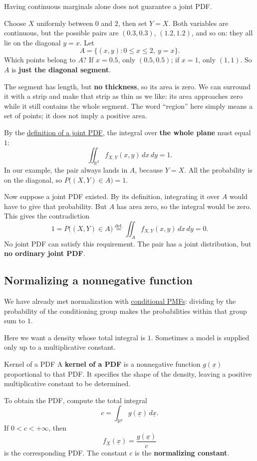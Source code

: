 \documentclass[a4paper,12pt,oneside]{report}
\begin{document}
\begin{notebox}
Having continuous marginals alone does not guarantee a joint PDF.

Choose $X$ uniformly between $0$ and $2$, then set $Y=X$.
Both variables are continuous, but the possible pairs are
$(0.3,0.3)$, $(1.2,1.2)$, and so on: they all lie on the
diagonal $y=x$. Let
\[
  A=\{(x,y):0\leq x\leq2,\ y=x\}.
\]
Which points belong to $A$? If $x=0.5$, only $(0.5,0.5)$;
if $x=1$, only $(1,1)$. So $A$ is \textbf{just the diagonal
segment}.

The segment has length, but \textbf{no thickness}, so its area
is zero. We can surround it with a strip and make that strip
as thin as we like: its area approaches zero while it still
contains the whole segment. The word ``region'' here simply
means a set of points; it does not imply a positive area.

By the \hyperref[def:joint-pdf]{definition of a joint PDF}, the integral
over \textbf{the whole plane} must equal $1$:
\[
  \iint_{\mathbb R^2}f_{X,Y}(x,y)\,dx\,dy=1.
\]
In our example, the pair always lands in $A$, because
$Y=X$. All the probability is on the diagonal, so
$P\bigl((X,Y)\in A\bigr)=1$.

Now suppose a joint PDF existed. By its definition, integrating
it over $A$ would have to give that probability. But $A$ has area
zero, so the integral would be zero. This gives the contradiction
\[
  1=P\bigl((X,Y)\in A\bigr)
    \overset{\text{def.}}{=}\iint_A f_{X,Y}(x,y)\,dx\,dy=0.
\]
No joint PDF can satisfy this requirement. The pair has a joint
distribution, but \textbf{no ordinary joint PDF}.
\end{notebox}

\subsection{Normalizing a nonnegative function}

We have already met normalization with
\hyperref[sec:conditional-pmf]{conditional PMFs}: dividing by
the probability of the conditioning group makes the probabilities
within that group sum to $1$.

Here we want a density whose total integral is $1$.
Sometimes a model is supplied only up to a multiplicative constant.

\begin{frameddefn}{Kernel of a PDF}
\label{def:pdf-kernel}
A \textbf{kernel of a PDF} is a nonnegative function
$g(\underline{x})$ proportional to that PDF. It specifies the
shape of the density, leaving a positive multiplicative constant
to be determined.

To obtain the PDF, compute the total integral
\[
  c=\int_{\mathbb R^p}g(\underline{x})\,d\underline{x}.
\]
If $0<c<+\infty$, then
\[
  f_{\underline{X}}(\underline{x})=\frac{g(\underline{x})}{c}
\]
is the corresponding PDF. The constant $c$ is the
\textbf{normalizing constant}.
\end{frameddefn}
\end{document}
